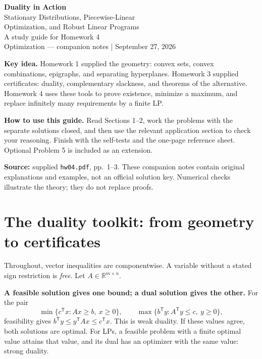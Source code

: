 \documentclass[11pt]{article}
\newenvironment{keyidea}{\begin{shaded}\noindent\textbf{Key idea.} }{\end{shaded}}
\newcommand{\R}{\mathbb R}
\newcommand{\T}{^{\mathsf T}}
\begin{document}
\begin{center}
{\LARGE\bfseries Duality in Action}\\[8pt]
{\Large Stationary Distributions, Piecewise-Linear\\[3pt]
Optimization, and Robust Linear Programs}\\[10pt]
{\large A study guide for Homework 4}\\[5pt]
Optimization --- companion notes \quad | \quad September 27, 2026
\end{center}
\tableofcontents
\medskip
\begin{keyidea}
Homework 1 supplied the geometry: convex sets, convex combinations,
epigraphs, and separating hyperplanes. Homework 3 supplied certificates:
duality, complementary slackness, and theorems of the alternative.
Homework 4 uses these tools to prove existence, minimize a maximum,
and replace infinitely many requirements by a finite LP.
\end{keyidea}
\textbf{How to use this guide.} Read Sections 1--2, work the problems with
the separate solutions closed, and then use the relevant application
section to check your reasoning. Finish with the self-tests and the
one-page reference sheet. Optional Problem 5 is included as an extension.

{\small\textbf{Source:} supplied \texttt{hw04.pdf}, pp.\ 1--3. These companion
notes contain original explanations and examples, not an official solution
key. Numerical checks illustrate the theory; they do not replace proofs.\par}

\newpage
\section{The duality toolkit: from geometry to certificates}
Throughout, vector inequalities are componentwise. A variable without a
stated sign restriction is \emph{free}. Let $A\in\R^{m\times n}$.

\textbf{A feasible solution gives one bound; a dual solution gives the other.}
For the pair
\[
\min\{c\T x:Ax\ge b,\ x\ge0\},\qquad
\max\{b\T y:A\T y\le c,\ y\ge0\},
\]
feasibility gives $b\T y\le y\T Ax\le c\T x$. This is weak duality.
If these values agree, both solutions are optimal. For LPs, a feasible
problem with a finite optimal value attains that value, and its dual
has an optimizer with the same value: strong duality.
\end{document}
